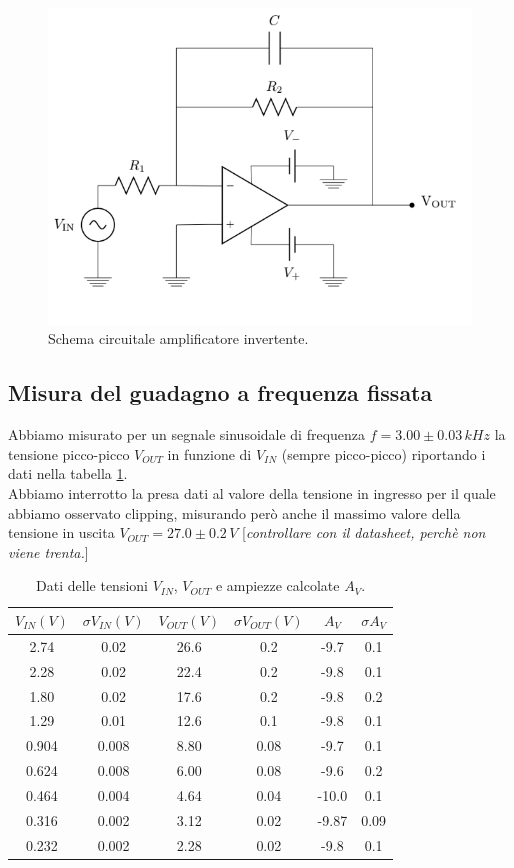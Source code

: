 \documentclass[10pt,a4paper]{article}
\newcommand{\rem}[1]{[\emph{#1}]}
\begin{document}
\begin{figure}[!htb]
  \centering
  \includegraphics[scale=0.5]{opampinvert.png}
\caption{Schema circuitale amplificatore invertente.}
\label{opampinvert}
\end{figure}

\subsection{Misura del guadagno a frequenza fissata}
Abbiamo misurato per un segnale sinusoidale di frequenza $f=3.00 \pm 0.03 \, kHz$ la tensione picco-picco $V_{OUT}$ in funzione di $V_{IN}$ (sempre picco-picco) riportando i dati nella tabella \ref{tabellaGuadagno}. \\
Abbiamo interrotto la presa dati al valore della tensione in ingresso per il quale abbiamo osservato clipping, misurando però anche il massimo valore della tensione in uscita  $V_{OUT} = 27.0\pm0.2 \, V$ \rem{controllare con il datasheet, perchè non viene trenta.}\\

\begin{table}[!htb]\centering
\begin{tabular}{|c|c|c|c|c|c|}
\hline
$V_{IN} (V)$ & $ \sigma V_{IN} (V)$ & $ V_{OUT} (V)$ & $ \sigma V_{OUT} (V)$ & $A_V$ & $\sigma A_V$\\  
\hline
2.74 & 0.02 & 26.6 & 0.2 & -9.7 & 0.1\\
2.28 & 0.02 & 22.4 & 0.2 & -9.8 & 0.1\\
1.80 & 0.02 & 17.6 & 0.2 & -9.8 & 0.2\\
1.29 & 0.01 & 12.6 & 0.1 & -9.8 & 0.1\\
0.904 & 0.008 & 8.80 & 0.08 & -9.7 & 0.1\\
0.624 & 0.008 & 6.00 & 0.08 & -9.6 & 0.2\\
0.464 & 0.004 & 4.64 & 0.04 & -10.0 & 0.1\\
0.316 & 0.002 & 3.12 & 0.02 & -9.87 & 0.09\\
0.232 & 0.002 & 2.28 & 0.02 & -9.8 & 0.1\\
\hline
\end{tabular}
\caption{Dati delle tensioni $V_{IN}$, $V_{OUT}$ e ampiezze calcolate $A_V$.}
\label{tabellaGuadagno}
\end{table}
\end{document}
